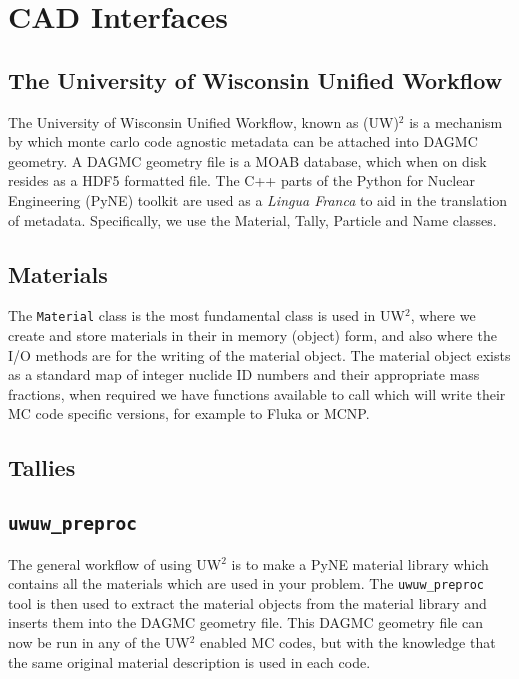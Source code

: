 
\section{CAD Interfaces}

\subsection{The University of Wisconsin Unified Workflow}
The University of Wisconsin Unified Workflow, known as (UW)$^2$ is a mechanism by which 
monte carlo code agnostic metadata can be attached into DAGMC geometry. A DAGMC geometry
file is a MOAB database, which when on disk resides as a HDF5 formatted file. The C++
parts of the Python for Nuclear Engineering (PyNE) toolkit are used as a \textit{Lingua Franca}
to aid in the translation of metadata. Specifically, we use the Material, Tally, Particle 
and Name classes.
\subsection{Materials}
The \texttt{Material} class is the most fundamental class is used in UW$^2$, where we create and store
materials in their in memory (object) form, and also where the I/O methods are for the writing 
of the material object. The material object exists as a standard map of integer nuclide ID numbers
and their appropriate mass fractions, when required we have functions available to call which will
write their MC code specific versions, for example to Fluka or MCNP. 
\subsection{Tallies}
\subsection{\texttt{uwuw\_preproc}}
The general workflow of using UW$^2$ is to make a PyNE material library which contains all the materials
which are used in your problem. The \texttt{uwuw\_preproc} tool is then used to extract the material 
objects from the material library and inserts them into the DAGMC geometry file. This DAGMC geometry
file can now be run in any of the UW$^2$ enabled MC codes, but with the knowledge that the same original
material description is used in each code. 
